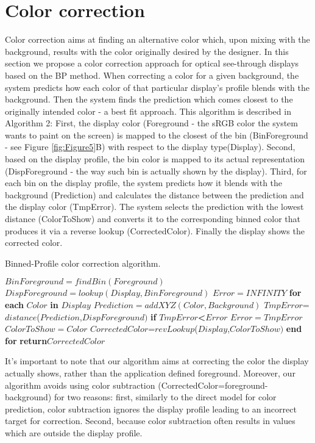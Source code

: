 \documentclass[annual]{acmsiggraph}
\begin{document}
\section{Color correction}
Color correction aims at finding an alternative color which, upon mixing with the background, results with the color originally desired by the designer. In this section we propose a color correction approach for optical see-through displays based on the BP method. When correcting a color for a given background, the system predicts how each color of that particular display's profile blends with the background. Then the system finds the prediction which comes closest to the originally intended color - a best fit approach. This algorithm is described in Algorithm 2: First, the display color (Foreground - the sRGB color the system wants to paint on the screen) is mapped to the closest of the bin (BinForeground - see Figure \ref{fig:Figure5}B) with respect to the display type(Display). Second, based on the display profile, the bin color is mapped to its actual representation (DispForeground - the way such bin is actually shown by the display). Third, for each bin on the display profile, the system predicts how it blends with the background (Prediction) and calculates the distance between the prediction and the display color (TmpError). The system selects the prediction with the lowest distance (ColorToShow) and converts it to the corresponding binned color that produces it via a reverse lookup (CorrectedColor). Finally the display shows the corrected color.
\begin{algorithm}
\caption{Binned-Profile color correction algorithm.}
\begin{algorithmic}
	\State $BinForeground=findBin(Foreground)$
    \State $DispForeground=lookup(Display,BinForeground)$
    \State $Error=INFINITY$
	\State \textbf{for each} $Color$ \textbf{in} $Display$
     \State \quad$Prediction=addXYZ(Color,Background)$
     \State \quad$TmpError$=$distance$($Prediction$,$DispForeground)$
	 \State \quad\textbf{if} $TmpError$\textbf{<}$ Error$
	  \State \qquad $Error=TmpError$
	  \State \qquad$ColorToShow=Color$
   	 \State $CorrectedColor$=$revLookup$($Display$,$ColorToShow)$
   	\State \textbf{end for}
	\State \textbf{return}$CorrectedColor$
	\EndProcedure
  \end{algorithmic}
\label{alg:2}
\end{algorithm}
It's important to note that our algorithm aims at correcting the color the display actually shows, rather than the application defined foreground. Moreover, our algorithm avoids using color subtraction (CorrectedColor=foreground-background) for two reasons: first, similarly to the direct model for color prediction, color subtraction ignores the display profile leading to an incorrect target for correction. Second, because color subtraction often results in values which are outside the display profile.
\end{document}
